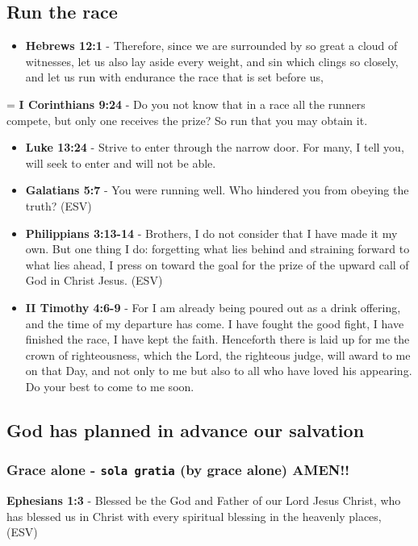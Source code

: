 \documentclass[11pt]{article}
\begin{document}
\subsection{Run the race}
\label{sec:org18d5644}
\begin{itemize}
\item \textbf{Hebrews 12:1} - Therefore, since we are surrounded by so great a cloud of witnesses, let us also lay aside every weight, and sin which clings so closely, and let us run with endurance the race that is set before us,
\end{itemize}
= \textbf{I Corinthians 9:24} - Do you not know that in a race all the runners compete, but only one receives the prize? So run that you may obtain it.
\begin{itemize}
\item \textbf{Luke 13:24} - Strive to enter through the narrow door. For many, I tell you, will seek to enter and will not be able.
\item \textbf{Galatians 5:7} - You were running well. Who hindered you from obeying the truth? (ESV)
\item \textbf{Philippians 3:13-14} - Brothers, I do not consider that I have made it my own. But one thing I do: forgetting what lies behind and straining forward to what lies ahead, I press on toward the goal for the prize of the upward call of God in Christ Jesus. (ESV)
\item \textbf{II Timothy 4:6-9} - For I am already being poured out as a drink offering, and the time of my departure has come. I have fought the good fight, I have finished the race, I have kept the faith. Henceforth there is laid up for me the crown of righteousness, which the Lord, the righteous judge, will award to me on that Day, and not only to me but also to all who have loved his appearing. Do your best to come to me soon.
\end{itemize}

\subsection{God has planned in advance our salvation}
\label{sec:orged537e3}
\subsubsection{Grace alone - \texttt{sola gratia} (by grace alone) AMEN!!}
\label{sec:org019b561}
\textbf{Ephesians 1:3} - Blessed be the God and Father of our Lord Jesus Christ, who has blessed us in Christ with every spiritual blessing in the heavenly places, (ESV)
\end{document}

